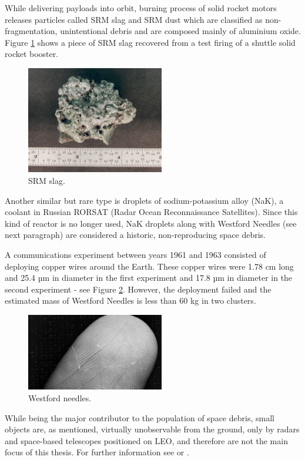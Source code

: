 	While delivering payloads into orbit, burning process of solid rocket motors releases particles called SRM slag and SRM dust which are classified as non-fragmentation, unintentional debris and are composed mainly of aluminium oxide. Figure \ref{fig:srmslag} shows a piece of SRM slag recovered from a test firing of a shuttle solid rocket booster.
	
\begin{figure}[H]
\centering
  \includegraphics[width=6cm]{images/slag}
  \caption{SRM slag.}
  \label{fig:srmslag}
\end{figure}	
	
	Another similar but rare type is droplets of sodium-potassium alloy (NaK), a coolant in Russian RORSAT (Radar Ocean Reconnaissance Satellites). Since this kind of reactor is no longer used, NaK droplets along with Westford Needles (see next paragraph) are considered a historic, non-reproducing space debris. 
	
	A communications experiment between years 1961 and 1963 consisted of deploying copper wires around the Earth. These copper wires were 1.78 cm long and 25.4 µm in diameter in the first experiment and 17.8 µm in diameter in the second experiment - see Figure \ref{fig:westfordneedles}. However, the deployment failed and the estimated mass of Westford Needles is less than 60 kg in two clusters.
	
\begin{figure}[H]
\centering
  \includegraphics[width=6cm]{images/westfordneedles}
  \caption{Westford needles.}
  \label{fig:westfordneedles}
\end{figure}	
	
	While being the major contributor to the population of space debris, small objects are, as mentioned, virtually unobservable from the ground, only by radars and space-based telescopes positioned on LEO, and therefore are not the main focus of this thesis. For further information see \citep{klinkrad2006space} or \citep{Silha2012id}.

